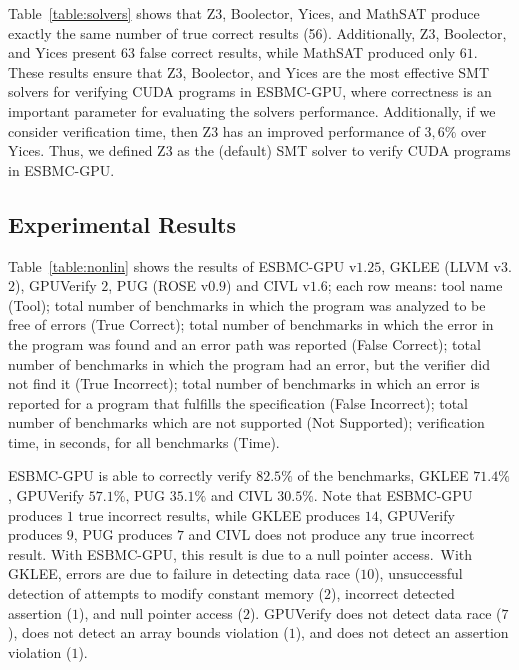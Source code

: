 \documentclass[times, doublespace]{cpeauth}
\begin{document}
Table~\ref{table:solvers} shows that Z$3$, Boolector, Yices, and MathSAT produce exactly the same number of true correct results (56). Additionally, Z3, Boolector, and Yices present $63$ false correct results, while MathSAT produced only $61$. These results ensure that Z3, Boolector, and Yices are the most effective SMT solvers for verifying CUDA programs in ESBMC-GPU, where correctness is an important parameter for evaluating the solvers performance. Additionally, if we consider verification time, then Z$3$ has an improved performance of $3,6\%$ over Yices. Thus, we defined Z3 as the (default) SMT solver to verify CUDA programs in ESBMC-GPU.

\subsection{Experimental Results}
\vspace{-2pt}

Table~\ref{table:nonlin} shows the results of ESBMC-GPU v$1$.$25$, GKLEE (LLVM v$3$.$2$), GPUVerify $2$, PUG (ROSE v$0$.$9$) and CIVL v$1$.$6$; each row means: 
tool name (Tool); 
total number of benchmarks in which the program was analyzed to be free of errors (True Correct); 
total number of benchmarks in which the error in the program was found and an error path was reported (False Correct);
total number of benchmarks in which the program had an error, but the verifier did not find it (True Incorrect); 
total number of benchmarks in which an error is reported for a program that fulfills the specification (False Incorrect);
total number of benchmarks which are not supported (Not Supported); 
verification time, in seconds, for all benchmarks (Time).

ESBMC-GPU is able to correctly verify $82.5\%$ of the benchmarks, GKLEE $71.4\%$, GPUVerify $57.1\%$, PUG $35.1\%$ and CIVL $30.5\%$. Note that ESBMC-GPU produces $1$ true incorrect results, while GKLEE produces $14$, GPUVerify produces $9$, PUG produces $7$ and CIVL does not produce any true incorrect result.
With ESBMC-GPU, this result is due to a null pointer access.\
With GKLEE, errors are due to failure in detecting data race ($10$), unsuccessful detection of attempts to modify constant memory ($2$), incorrect detected assertion ($1$), and null pointer access ($2$).
GPUVerify does not detect data race ($7$), does not detect an array bounds violation ($1$), and does not detect an assertion violation ($1$).
\end{document}
